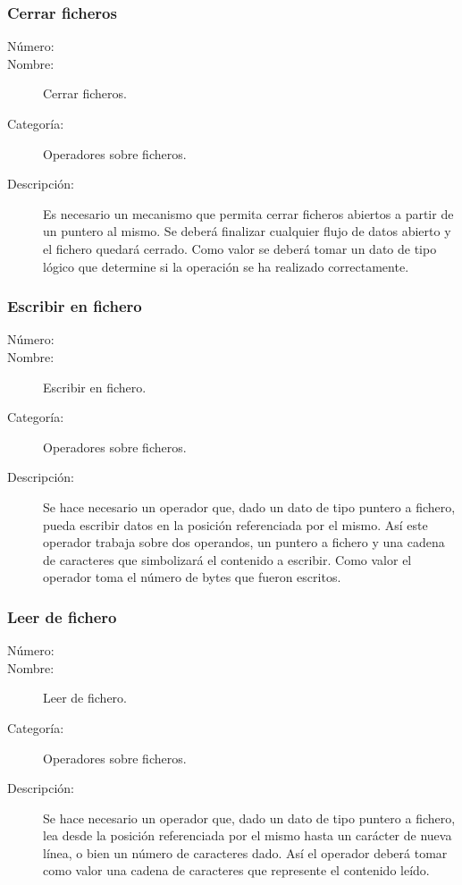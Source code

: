 \subsubsection{Cerrar ficheros}
	\begin{description}
		\item [Número:] \cn
		\item [Nombre:] Cerrar ficheros.
		\item [Categoría:] Operadores sobre ficheros.
		\item [Descripción:] Es necesario un mecanismo que permita cerrar ficheros abiertos a partir de un puntero al mismo.
		Se deberá finalizar cualquier flujo de datos abierto y el fichero quedará cerrado. Como valor se deberá tomar 
		un dato de tipo lógico que determine si la operación se ha realizado correctamente.
	\end {description}

\subsubsection{Escribir en fichero}
	\begin{description}
		\item [Número:] \cn
		\item [Nombre:] Escribir en fichero.
		\item [Categoría:] Operadores sobre ficheros.
		\item [Descripción:] Se hace necesario un operador que, dado un dato de tipo puntero a fichero, pueda escribir datos
		en la posición referenciada por el mismo. Así este operador trabaja sobre dos operandos, un puntero a fichero y una 
		cadena de caracteres que simbolizará el contenido a escribir. Como valor el operador toma el número de bytes que 
		fueron escritos.
	\end{description}

\subsubsection{Leer de fichero}
	\begin{description}
		\item [Número:] \cn
		\item [Nombre:] Leer de fichero.
		\item [Categoría:] Operadores sobre ficheros.
		\item [Descripción:] Se hace necesario un operador que, dado un dato de tipo puntero a fichero, lea desde la
		posición referenciada por el mismo hasta un carácter de nueva línea, o bien un número de caracteres dado. Así el operador deberá tomar como valor 
		una cadena de caracteres que represente el contenido leído.
	\end{description}

